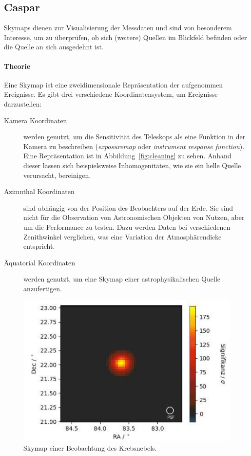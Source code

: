 \subsection{Caspar}%
\label{sub:caspar}


Skymaps dienen zur Visualisierung der Messdaten und sind von besonderem
Interesse, um zu überprüfen, ob sich (weitere) Quellen im Blickfeld befinden
oder die Quelle an sich ausgedehnt ist.

\paragraph{Theorie}%

Eine Skymap ist eine zweidimensionale Repräsentation der aufgenommen Ereignisse.
Es gibt drei verschiedene Koordinatensystem, um Ereignisse darzustellen:

\begin{description}
  \item[\quad Kamera Koordinaten] werden genutzt, um die Sensitivität des
    Teleskops
    als eine Funktion in der Kamera zu beschreiben
    (\textit{exposuremap} oder \textit{instrument response function}).
    Eine Repräsentation ist in Abbildung~\ref{fig:cleaning} zu sehen.
    Anhand dieser lassen sich beispielsweise Inhomogenitäten,
    wie sie ein helle Quelle verursacht, bereinigen.
  \item[\quad Azimuthal Koordinaten] sind abhängig von der Position des
    Beobachters auf der Erde.
    Sie sind nicht für die Observation von Astronomischen Objekten von Nutzen,
    aber um die Performance zu testen.
    Dazu werden Daten bei verschiedenen Zenithwinkel verglichen,
    was eine Variation der Atmosphärendicke entspricht.
  \item[\quad Äquatorial Koordinaten] werden genutzt, um eine Skymap einer astrophysikalischen Quelle anzufertigen.
\end{description}

\begin{figure}
  \centering
  \includegraphics[width=\linewidth]{pictures/skymap.jpg}
  \caption{Skymap einer Beobachtung des Krebsnebels.}%
  \label{fig:skymap}
\end{figure}

